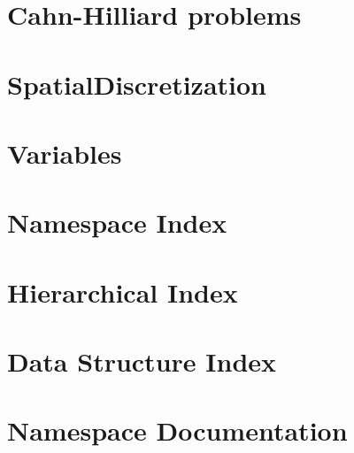 \documentclass[twoside]{book}
\newcommand{\+}{\discretionary{\mbox{\scriptsize$\hookleftarrow$}}{}{}}
\begin{document}
\chapter{Cahn-\/\+Hilliard problems}
\label{__cahnhilliard}

\chapter{Spatial\+Discretization}
\label{__spatial}

\chapter{Variables}
\label{__variables}

\chapter{Namespace Index}

\chapter{Hierarchical Index}

\chapter{Data Structure Index}

\chapter{Namespace Documentation}


\end{document}

